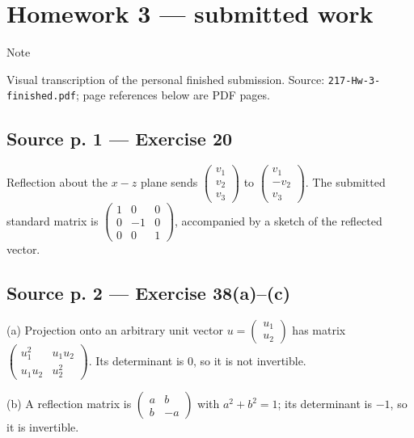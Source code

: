 \section{Homework 3 --- submitted work}

\begin{qlnote}{Note}

Visual transcription of the personal finished submission. Source: \texttt{217-Hw-3-finished.pdf}; page references below are PDF pages.

\end{qlnote}

\subsection{Source p. 1 --- Exercise 20}

Reflection about the \(x - z\) plane sends \(\begin{pmatrix}
v_{1} \\
v_{2} \\
v_{3}
\end{pmatrix}\) to \(\begin{pmatrix}
v_{1} \\
{- v_{2}} \\
v_{3}
\end{pmatrix}\). The submitted standard matrix is \(\begin{pmatrix}
1 & 0 & 0 \\
0 & {- 1} & 0 \\
0 & 0 & 1
\end{pmatrix}\), accompanied by a sketch of the reflected vector.

\subsection{Source p. 2 --- Exercise 38(a)--(c)}

(a) Projection onto an arbitrary unit vector \(u = \begin{pmatrix}
u_{1} \\
u_{2}
\end{pmatrix}\) has matrix \(\begin{pmatrix}
u_{1}^{2} & {u_{1}u_{2}} \\
{u_{1}u_{2}} & u_{2}^{2}
\end{pmatrix}\). Its determinant is \(0\), so it is not invertible.

(b) A reflection matrix is \(\begin{pmatrix}
a & b \\
b & {- a}
\end{pmatrix}\) with \(a^{2} + b^{2} = 1\); its determinant is \(- 1\), so it is invertible.

